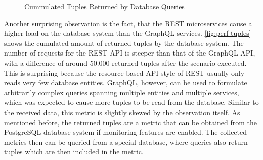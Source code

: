 \begin{figure}[t!]
    \centering
    \caption{Cummulated Tuples Returned by Database Queries}\label{fig:perf-tuples}    
\end{figure}

Another surprising observation is the fact, that the \ac{REST} microservices cause a higher load on the database system than the GraphQL services.
\autoref{fig:perf-tuples} shows the cumulated amount of returned tuples by the database system.
The number of requests for the \ac{REST} \ac{API} is steeper than that of the GraphQL \ac{API}, with a difference of around 50.000 returned tuples after the scenario executed.
This is surprising because the resource-based \ac{API} style of \ac{REST} usually only reads very few database entities.
GraphQL, however, can be used to formulate arbitrarily complex queries spanning multiple entities and multiple services, which was expected to cause more tuples to be read from the database.
Similar to the received data, this metric is slightly skewed by the observation itself.
As mentioned before, the returned tuples are a metric that can be obtained from the PostgreSQL database system if monitoring features are enabled.
The collected metrics then can be queried from a special database, where queries also return tuples which are then included in the metric.

